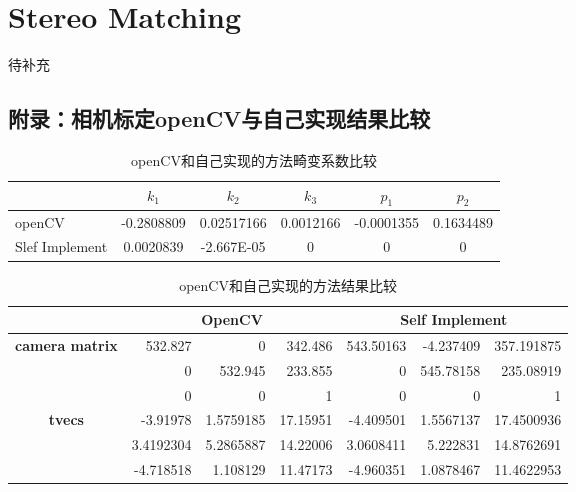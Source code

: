 \documentclass[UTF8]{ctexart}
\begin{document}
\section{Stereo Matching}
待补充


\begin{appendices}
\section{附录：相机标定openCV与自己实现结果比较}\label{appendices:A}
\begin{table}[htbp]
  \centering
  \caption{openCV和自己实现的方法畸变系数比较}
    \begin{tabular}{lccccc}
    \toprule
          & \multicolumn{1}{c}{$k_1$} & \multicolumn{1}{c}{$k_2$} & \multicolumn{1}{c}{$k_3$} & \multicolumn{1}{c}{$p_1$} & \multicolumn{1}{c}{$p_2$} \\
    \midrule
    openCV  & -0.2808809 & 0.02517166 & 0.0012166 & -0.0001355 & 0.1634489 \\
    \midrule
    Slef Implement & 0.0020839 & -2.667E-05 & 0     & 0     & 0 \\
    \bottomrule
    \end{tabular}%
  \label{tab:distort}%
\end{table}%
\begin{table}[htbp]
  \centering
  \caption{openCV和自己实现的方法结果比较}
    \begin{tabular}{|c|r|r|r|r|r|r|}
    \toprule[2pt]
          & \multicolumn{3}{|c|}{\textbf{OpenCV}} & \multicolumn{3}{|c|}{\textbf{Self Implement}} \\
    \bottomrule[2pt]
    \toprule[1pt]
    \multicolumn{1}{|c|}{\multirow{3}[5]{*}{\textbf{camera matrix}}} & 532.827 & 0     & 342.486 & 543.50163 & -4.237409 & 357.191875 \\
\cmidrule{2-7}          & 0     & 532.945 & 233.855 & 0     & 545.78158 & 235.08919 \\
\cmidrule{2-7}          & 0     & 0     & 1     & 0     & 0     & 1 \\
    \bottomrule[1pt]
    \toprule[1pt]
    \multirow{13}[26]{*}{\textbf{tvecs}} & -3.91978 & 1.5759185 & 17.15951 & -4.409501 & 1.5567137 & 17.4500936 \\
\cmidrule{2-7}          & 3.4192304 & 5.2865887 & 14.22006 & 3.0608411 & 5.222831 & 14.8762691 \\
\cmidrule{2-7}          & -4.718518 & 1.108129 & 11.47173 & -4.960351 & 1.0878467 & 11.4622953 \\

\end{tabular}
\end{table}
\end{appendices}
\end{document}
